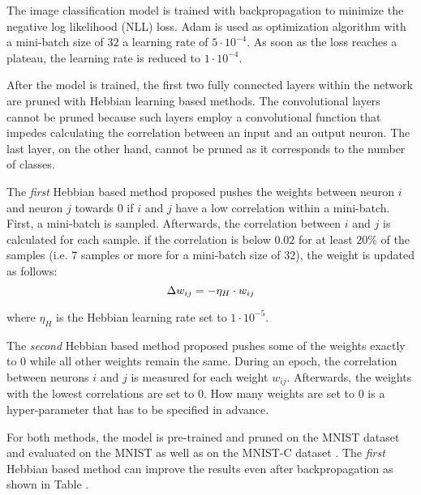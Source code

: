 The image classification model is trained with backpropagation to minimize the negative log likelihood (NLL) loss.
Adam  is used as optimization algorithm with a mini-batch size of \(32\) a learning rate of \(5\cdot 10^{-4}\).
As soon as the loss reaches a plateau, the learning rate is reduced to \(1\cdot 10^{-4}\).

After the model is trained, the first two fully connected layers within the network are pruned with Hebbian learning based methods.
The convolutional layers cannot be pruned because such layers employ a convolutional function that impedes calculating the correlation between an input and an output neuron.
The last layer, on the other hand, cannot be pruned as it corresponds to the number of classes.

The \emph{first} Hebbian based method proposed pushes the weights between neuron \(i\) and neuron \(j\) towards \(0\) if \(i\) and \(j\) have a low correlation within a mini-batch.
First, a mini-batch is sampled.
Afterwards, the correlation between \(i\) and \(j\) is calculated for each sample.
if the correlation is below \(0.02\) for at least \(20\%\) of the samples (i.e. \(7\) samples or more for a mini-batch size of \(32\)), the weight is updated as follows:
\begin{equation}\eqlbl{hebb_towards_0}
	\Delta w_{ij} = - \eta_H \cdot w_{ij}
\end{equation}

where \(\eta_H\) is the Hebbian learning rate set to \(1\cdot 10^{-5}\).

The \emph{second} Hebbian based method proposed pushes some of the weights exactly to \(0\) while all other weights remain the same.
During an epoch, the correlation between neurons \(i\) and \(j\) is measured for each weight \(w_{ij}\).
Afterwards, the weights with the lowest correlations are set to \(0\).
How many weights are set to \(0\) is a hyper-parameter that has to be specified in advance.

For both methods, the model is pre-trained and pruned on the MNIST dataset \cite{MNIST} and evaluated on the MNIST as well as on the MNIST-C dataset \cite{Mu_Gilmer_2019}.
The \emph{first} Hebbian based method can improve the results even after backpropagation as shown in Table .

